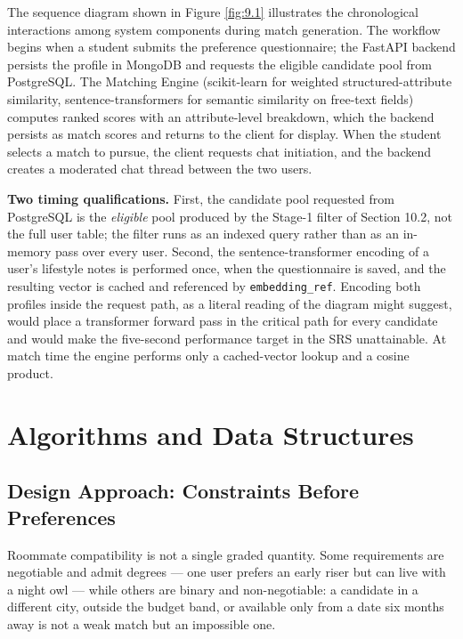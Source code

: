 \documentclass[12pt,a4paper]{report}
\begin{document}
\vspace{4mm}
The sequence diagram shown in Figure \ref{fig:9.1} illustrates the chronological interactions among system components during match generation. The workflow begins when a student submits the preference questionnaire; the FastAPI backend persists the profile in MongoDB and requests the eligible candidate pool from PostgreSQL. The Matching Engine (scikit-learn for weighted structured-attribute similarity, sentence-transformers for semantic similarity on free-text fields) computes ranked scores with an attribute-level breakdown, which the backend persists as match scores and returns to the client for display. When the student selects a match to pursue, the client requests chat initiation, and the backend creates a moderated chat thread between the two users.

\vspace{2mm}
\noindent\textbf{Two timing qualifications.} First, the candidate pool requested from PostgreSQL is the \emph{eligible} pool produced by the Stage-1 filter of Section 10.2, not the full user table; the filter runs as an indexed query rather than as an in-memory pass over every user. Second, the sentence-transformer encoding of a user's lifestyle notes is performed once, when the questionnaire is saved, and the resulting vector is cached and referenced by \texttt{embedding\_ref}. Encoding both profiles inside the request path, as a literal reading of the diagram might suggest, would place a transformer forward pass in the critical path for every candidate and would make the five-second performance target in the SRS unattainable. At match time the engine performs only a cached-vector lookup and a cosine product.

\chapter{Algorithms and Data Structures}

\section{Design Approach: Constraints Before Preferences}

Roommate compatibility is not a single graded quantity. Some requirements are negotiable and admit degrees --- one user prefers an early riser but can live with a night owl --- while others are binary and non-negotiable: a candidate in a different city, outside the budget band, or available only from a date six months away is not a weak match but an impossible one.
\end{document}
